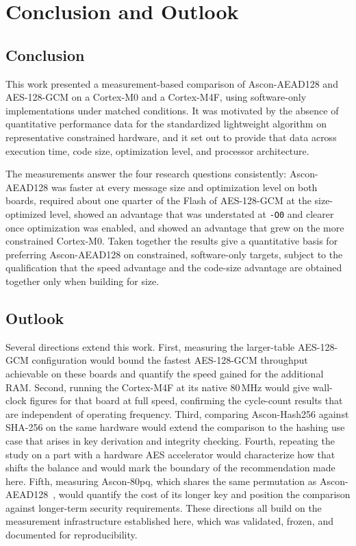 \chapter{Conclusion and Outlook}

\section{Conclusion}

This work presented a measurement-based comparison of Ascon-AEAD128 and
AES-128-GCM on a Cortex-M0 and a Cortex-M4F, using software-only implementations
under matched conditions.
It was motivated by the absence of quantitative performance data for the
standardized lightweight algorithm on representative constrained hardware, and it
set out to provide that data across execution time, code size, optimization
level, and processor architecture.

The measurements answer the four research questions consistently: Ascon-AEAD128
was faster at every message size and optimization level on both boards, required
about one quarter of the Flash of AES-128-GCM at the size-optimized level, showed
an advantage that was understated at \texttt{-O0} and clearer once optimization
was enabled, and showed an advantage that grew on the more constrained
Cortex-M0.
Taken together the results give a quantitative basis for preferring
Ascon-AEAD128 on constrained, software-only targets, subject to the
qualification that the speed advantage and the code-size advantage are obtained
together only when building for size.

\section{Outlook}

Several directions extend this work.
First, measuring the larger-table AES-128-GCM configuration would bound the
fastest AES-128-GCM throughput achievable on these boards and quantify the speed
gained for the additional RAM.
Second, running the Cortex-M4F at its native 80\,MHz would give wall-clock
figures for that board at full speed, confirming the cycle-count results that
are independent of operating frequency.
Third, comparing Ascon-Hash256 against SHA-256 on the same hardware would extend
the comparison to the hashing use case that arises in key derivation and
integrity checking.
Fourth, repeating the study on a part with a hardware AES accelerator would
characterize how that shifts the balance and would mark the boundary of the
recommendation made here.
Fifth, measuring Ascon-80pq, which shares the same permutation as
Ascon-AEAD128~\cite{ASCONSpec}, would quantify the cost of its longer key and
position the comparison against longer-term security requirements.
These directions all build on the measurement infrastructure established here,
which was validated, frozen, and documented for reproducibility.
